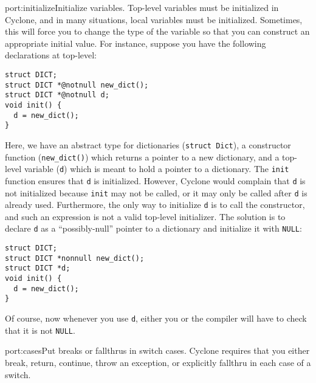 \begin{porta}{port:initialize}{Initialize variables.}  
Top-level variables must be initialized
in Cyclone, and in many situations, local variables must be initialized.
Sometimes, this will force you to change the type of the variable
so that you can construct an appropriate initial value.  For instance,
suppose you have the following declarations at top-level:
\begin{verbatim}
struct DICT; 
struct DICT *@notnull new_dict();
struct DICT *@notnull d;
void init() {
  d = new_dict();
}
\end{verbatim}

Here, we have an abstract type for dictionaries 
(\texttt{struct Dict}), a constructor
function (\texttt{new\_dict()}) which returns a pointer to a new
dictionary, and a top-level variable (\texttt{d}) which is meant
to hold a pointer to a dictionary.  The \texttt{init} function
ensures that \texttt{d} is initialized.  However, 
Cyclone would complain that 
\texttt{d} is not initialized because \texttt{init} may not be
called, or it may only be called after \texttt{d} is already used.  
Furthermore, the only way to initialize \texttt{d}
is to call the constructor, and such an expression is not a 
valid top-level initializer.  The solution is to declare \texttt{d} as
a ``possibly-null'' pointer to a dictionary and initialize it
with \texttt{NULL}:
\begin{verbatim}
struct DICT; 
struct DICT *nonnull new_dict();
struct DICT *d;
void init() {
  d = new_dict();
}
\end{verbatim}

Of course, now whenever you use \texttt{d}, either you or the compiler
will have to check that it is not \texttt{NULL}.
\end{porta}

\begin{porta}{port:cases}{Put breaks or fallthrus in switch cases.}  
Cyclone requires
that you either break, return, continue, throw an exception, or explicitly
fallthru in each case of a switch.  
\end{porta}

